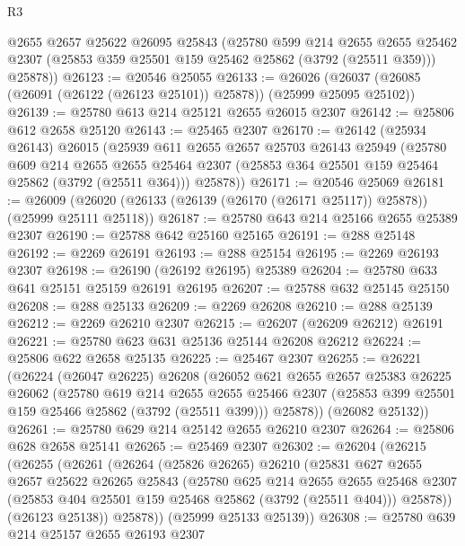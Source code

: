 \begin{lexlean}{R3}
\begin{coremodule}
      @2655
      @2657
      @25622
      @26095
      @25843
      (@25780
        @599
        @214
        @2655
        @2655
        @25462
        @2307
        (@25853 @359 @25501 @159 @25462 @25862 (@3792 (@25511 @359)))
        @25878))
@26123 := @20546 @25055
@26133 := @26026 (@26037 (@26085 (@26091 (@26122 (@26123 @25101)) @25878)) (@25999 @25095 @25102))
@26139 := @25780 @613 @214 @25121 @2655 @26015 @2307
@26142 := @25806 @612 @2658 @25120
@26143 := @25465 @2307
@26170 := @26142
    (@25934 @26143)
    @26015
    (@25939
      @611
      @2655
      @2657
      @25703
      @26143
      @25949
      (@25780
        @609
        @214
        @2655
        @2655
        @25464
        @2307
        (@25853 @364 @25501 @159 @25464 @25862 (@3792 (@25511 @364)))
        @25878))
@26171 := @20546 @25069
@26181 := @26009 (@26020 (@26133 (@26139 (@26170 (@26171 @25117)) @25878)) (@25999 @25111 @25118))
@26187 := @25780 @643 @214 @25166 @2655 @25389 @2307
@26190 := @25788 @642 @25160 @25165
@26191 := @288 @25148
@26192 := @2269 @26191
@26193 := @288 @25154
@26195 := @2269 @26193 @2307
@26198 := @26190 (@26192 @26195) @25389
@26204 := @25780 @633 @641 @25151 @25159 @26191 @26195
@26207 := @25788 @632 @25145 @25150
@26208 := @288 @25133
@26209 := @2269 @26208
@26210 := @288 @25139
@26212 := @2269 @26210 @2307
@26215 := @26207 (@26209 @26212) @26191
@26221 := @25780 @623 @631 @25136 @25144 @26208 @26212
@26224 := @25806 @622 @2658 @25135
@26225 := @25467 @2307
@26255 := @26221
    (@26224
      (@26047 @26225)
      @26208
      (@26052
        @621
        @2655
        @2657
        @25383
        @26225
        @26062
        (@25780
          @619
          @214
          @2655
          @2655
          @25466
          @2307
          (@25853 @399 @25501 @159 @25466 @25862 (@3792 (@25511 @399)))
          @25878))
      (@26082 @25132))
@26261 := @25780 @629 @214 @25142 @2655 @26210 @2307
@26264 := @25806 @628 @2658 @25141
@26265 := @25469 @2307
@26302 := @26204
    (@26215
      (@26255
        (@26261
          (@26264
            (@25826 @26265)
            @26210
            (@25831
              @627
              @2655
              @2657
              @25622
              @26265
              @25843
              (@25780
                @625
                @214
                @2655
                @2655
                @25468
                @2307
                (@25853 @404 @25501 @159 @25468 @25862 (@3792 (@25511 @404)))
                @25878))
            (@26123 @25138))
          @25878))
      (@25999 @25133 @25139))
@26308 := @25780 @639 @214 @25157 @2655 @26193 @2307

\end{coremodule}
\end{lexlean}
